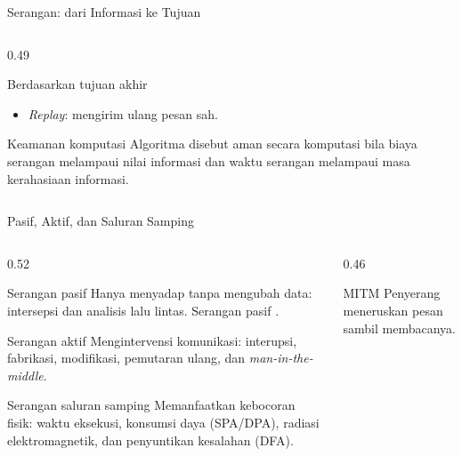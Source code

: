 \documentclass[aspectratio=169,11pt]{beamer}
\begin{document}
\begin{frame}{Serangan: dari Informasi ke Tujuan}
\begin{columns}[T,onlytextwidth]
\begin{column}{0.49\textwidth}
\begin{block}{Berdasarkan tujuan akhir}
\begin{itemize}
                    \item \textit{Replay}: mengirim ulang pesan sah.
                \end{itemize}
            \end{block}
            \begin{alertblock}{Keamanan komputasi}
                \footnotesize
                Algoritma disebut aman secara komputasi bila biaya serangan
                melampaui nilai informasi dan waktu serangan melampaui masa
                kerahasiaan informasi.
            \end{alertblock}
        \end{column}
    \end{columns}
\end{frame}

\begin{frame}{Pasif, Aktif, dan Saluran Samping}
    \scriptsize
    \begin{columns}[T,onlytextwidth]
        \begin{column}{0.52\textwidth}
            \begin{block}{Serangan pasif}
                Hanya menyadap tanpa mengubah data: intersepsi dan analisis
                lalu lintas. Serangan pasif .
            \end{block}
            \begin{block}{Serangan aktif}
                Mengintervensi komunikasi: interupsi, fabrikasi, modifikasi,
                pemutaran ulang, dan \textit{man-in-the-middle}.
            \end{block}
            \begin{alertblock}{Serangan saluran samping}
                Memanfaatkan kebocoran fisik: waktu eksekusi, konsumsi daya
                (SPA/DPA), radiasi elektromagnetik, dan penyuntikan kesalahan
                (DFA).
            \end{alertblock}
        \end{column}
        \begin{column}{0.46\textwidth}
            \centering
            \vspace{0.1cm}
            \begin{exampleblock}{MITM}
                \footnotesize
                Penyerang meneruskan pesan sambil membacanya.
            \end{exampleblock}
        \end{column}
    \end{columns}
\end{frame}
\end{document}
